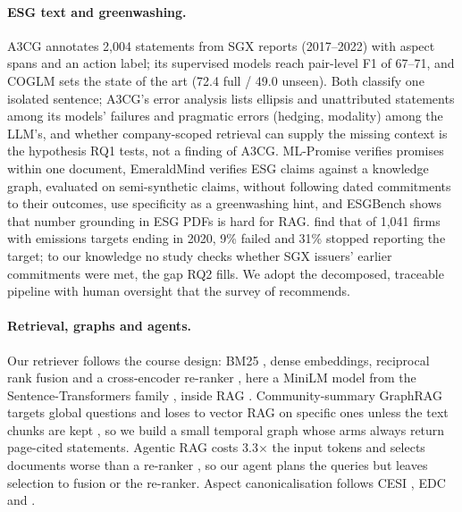 \documentclass[11pt]{article}
\begin{document}
\paragraph{ESG text and greenwashing.}
A3CG \citep{ong-etal-2025-a3cg} annotates 2,004 statements from SGX reports (2017--2022) with aspect spans and an action label; its supervised models reach pair-level F1 of 67--71, and COGLM \citep{braun2026coglm} sets the state of the art (72.4 full / 49.0 unseen). Both classify one isolated sentence; A3CG's error analysis lists ellipsis and unattributed statements among its models' failures and pragmatic errors (hedging, modality) among the LLM's, and whether company-scoped retrieval can supply the missing context is the hypothesis RQ1 tests, not a finding of A3CG. ML-Promise \citep{seki-etal-2025-mlpromise} verifies promises within one document, EmeraldMind \citep{kaoukis2025emeraldmind} verifies ESG claims against a knowledge graph, evaluated on semi-synthetic claims, without following dated commitments to their outcomes, \citet{florstedt-etal-2025-greenwashing} use specificity as a greenwashing hint, and ESGBench \citep{george2025esgbench} shows that number grounding in ESG PDFs is hard for RAG. \citet{jiang2025targets} find that of 1,041 firms with emissions targets ending in 2020, 9\% failed and 31\% stopped reporting the target; to our knowledge no study checks whether SGX issuers' earlier commitments were met, the gap RQ2 fills. We adopt the decomposed, traceable pipeline with human oversight that the survey of \citet{calamai2025survey} recommends.

\paragraph{Retrieval, graphs and agents.}
Our retriever follows the course design: BM25 \citep{robertson2009bm25}, dense embeddings, reciprocal rank fusion \citep{cormack2009rrf} and a cross-encoder re-ranker \citep{nogueira2019passage}, here a MiniLM model \citep{wang2020minilm} from the Sentence-Transformers family \citep{reimers-gurevych-2019-sentence}, inside RAG \citep{lewis2020rag}. Community-summary GraphRAG \citep{edge2024graphrag} targets global questions and loses to vector RAG on specific ones unless the text chunks are kept \citep{zhou2025graphrag}, so we build a small temporal graph whose arms always return page-cited statements. Agentic RAG costs 3.3$\times$ the input tokens and selects documents worse than a re-ranker \citep{ferrazzi2026agentic}, so our agent plans the queries but leaves selection to fusion or the re-ranker. Aspect canonicalisation follows CESI \citep{vashishth2018cesi}, EDC \citep{zhang-soh-2024-edc} and \citet{peeters2025entity}.
\end{document}
